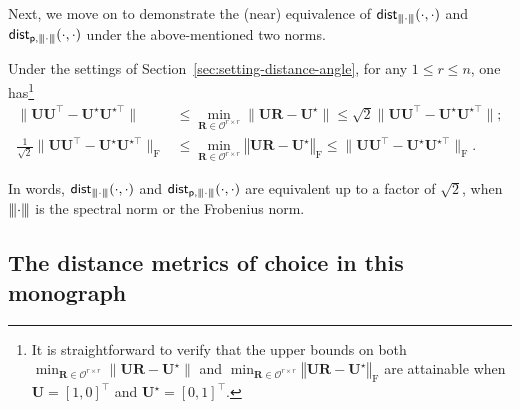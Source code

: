 Next, we move on to demonstrate the (near) equivalence of $\mathsf{dist}_{{\left\vert\kern-0.25ex\left\vert\kern-0.25ex\left\vert \cdot \right\vert\kern-0.25ex\right\vert\kern-0.25ex\right\vert}}(\cdot,\cdot)$ and $\mathsf{dist}_{\mathsf{p},{\left\vert\kern-0.25ex\left\vert\kern-0.25ex\left\vert \cdot \right\vert\kern-0.25ex\right\vert\kern-0.25ex\right\vert}}(\cdot,\cdot)$ under the above-mentioned two norms.



%
\begin{lemma}\label{prop:rotation-UR}
	Under the settings of Section~\ref{sec:setting-distance-angle}, for any $1 \leq r \leq n$,
	one has\footnote{It is straightforward to verify that the upper bounds on both $\min_{\bm{R}\in \mathcal{O}^{r\times r}}\big\|\bm{U}\bm{R}-\bm{U}^{\star}\big\|$ and $\min_{\bm{R}\in\mathcal{O}^{r\times r}}\left\Vert \bm{U}\bm{R}-\bm{U}^{\star}\right\Vert _{\mathrm{F}}$  are attainable when $\bm{U} = [1,0]^\top$ and $\bm{U}^\star = [0,1]^\top$.}
\begin{align*}
	\|\bm{U}\bm{U}^{\top} - \bm{U}^{\star}\bm{U}^{\star\top} \|
	&\leq
	\min_{\bm{R}\in \mathcal{O}^{r\times r}}\big\|\bm{U}\bm{R}-\bm{U}^{\star}\big\|
	\leq \sqrt{2} \|\bm{U}\bm{U}^{\top} - \bm{U}^{\star}\bm{U}^{\star\top} \|; \\
	\tfrac{1}{\sqrt{2}} \|\bm{U}\bm{U}^{\top} - \bm{U}^{\star}\bm{U}^{\star\top} \|_{\mathrm{F}}
	&\leq
	\min_{\bm{R}\in\mathcal{O}^{r\times r}}\left\Vert \bm{U}\bm{R}-\bm{U}^{\star}\right\Vert _{\mathrm{F}}
	\leq \|\bm{U}\bm{U}^{\top} - \bm{U}^{\star}\bm{U}^{\star\top} \|_{\mathrm{F}}.
\end{align*}
\end{lemma}
%
In words, $\mathsf{dist}_{{\left\vert\kern-0.25ex\left\vert\kern-0.25ex\left\vert \cdot \right\vert\kern-0.25ex\right\vert\kern-0.25ex\right\vert}}(\cdot,\cdot)$ and $\mathsf{dist}_{\mathsf{p},{\left\vert\kern-0.25ex\left\vert\kern-0.25ex\left\vert \cdot \right\vert\kern-0.25ex\right\vert\kern-0.25ex\right\vert}}(\cdot,\cdot)$
are equivalent up to a factor of $\sqrt{2}$, when ${\left\vert\kern-0.25ex\left\vert\kern-0.25ex\left\vert \cdot \right\vert\kern-0.25ex\right\vert\kern-0.25ex\right\vert}$ is the spectral norm or the Frobenius norm.







\subsection{The distance metrics of choice in this monograph}

